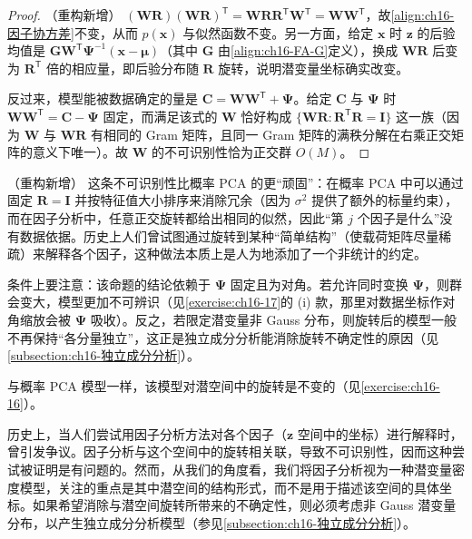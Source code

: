 \documentclass[../../main.tex]{subfiles}
\begin{document}
\begin{proof}（重构新增）
$(\bm{W}\bm{R})(\bm{W}\bm{R})^{\mathsf T}=\bm{W}\bm{R}\bm{R}^{\mathsf T}\bm{W}^{\mathsf T}=\bm{W}\bm{W}^{\mathsf T}$，故\eqref{align:ch16-因子协方差}不变，从而 $p(\bm{x})$ 与似然函数不变。另一方面，给定 $\bm{x}$ 时 $\bm{z}$ 的后验均值是 $\bm{G}\bm{W}^{\mathsf T}\bm{\Psi}^{-1}(\bm{x}-\bm{\mu})$（其中 $\bm{G}$ 由\eqref{align:ch16-FA-G}定义），换成 $\bm{W}\bm{R}$ 后变为 $\bm{R}^{\mathsf T}$ 倍的相应量，即后验分布随 $\bm{R}$ 旋转，说明潜变量坐标确实改变。

反过来，模型能被数据确定的量是 $\bm{C}=\bm{W}\bm{W}^{\mathsf T}+\bm{\Psi}$。给定 $\bm{C}$ 与 $\bm{\Psi}$ 时 $\bm{W}\bm{W}^{\mathsf T}=\bm{C}-\bm{\Psi}$ 固定，而满足该式的 $\bm{W}$ 恰好构成 $\{\bm{W}\bm{R}:\bm{R}^{\mathsf T}\bm{R}=\bm{I}\}$ 这一族（因为 $\bm{W}$ 与 $\bm{W}\bm{R}$ 有相同的 Gram 矩阵，且同一 Gram 矩阵的满秩分解在右乘正交矩阵的意义下唯一）。故 $\bm{W}$ 的不可识别性恰为正交群 $O(M)$。
\end{proof}

\begin{remark}（重构新增）
这条不可识别性比概率 PCA 的更“顽固”：在概率 PCA 中可以通过固定 $\bm{R}=\bm{I}$ 并按特征值大小排序来消除冗余（因为 $\sigma^2$ 提供了额外的标量约束），而在因子分析中，任意正交旋转都给出相同的似然，因此“第 $j$ 个因子是什么”没有数据依据。历史上人们曾试图通过旋转到某种“简单结构”（使载荷矩阵尽量稀疏）来解释各个因子，这种做法本质上是人为地添加了一个非统计的约定。

条件上要注意：该命题的结论依赖于 $\bm{\Psi}$ 固定且为对角。若允许同时变换 $\bm{\Psi}$，则群会变大，模型更加不可辨识（见\cref{exercise:ch16-17}的 (i) 款，那里对数据坐标作对角缩放会被 $\bm{\Psi}$ 吸收）。反之，若限定潜变量非 Gauss 分布，则旋转后的模型一般不再保持“各分量独立”，这正是独立成分分析能消除旋转不确定性的原因（见\cref{subsection:ch16-独立成分分析}）。
\end{remark}

与概率 PCA 模型一样，该模型对潜空间中的旋转是不变的（见\cref{exercise:ch16-16}）。

历史上，当人们尝试用因子分析方法对各个因子（$\bm{z}$ 空间中的坐标）进行解释时，曾引发争议。因子分析与这个空间中的旋转相关联，导致不可识别性，因而这种尝试被证明是有问题的。然而，从我们的角度看，我们将因子分析视为一种潜变量密度模型，关注的重点是其中潜空间的结构形式，而不是用于描述该空间的具体坐标。如果希望消除与潜空间旋转所带来的不确定性，则必须考虑非 Gauss 潜变量分布，以产生独立成分分析模型（参见\cref{subsection:ch16-独立成分分析}）。
\end{document}
